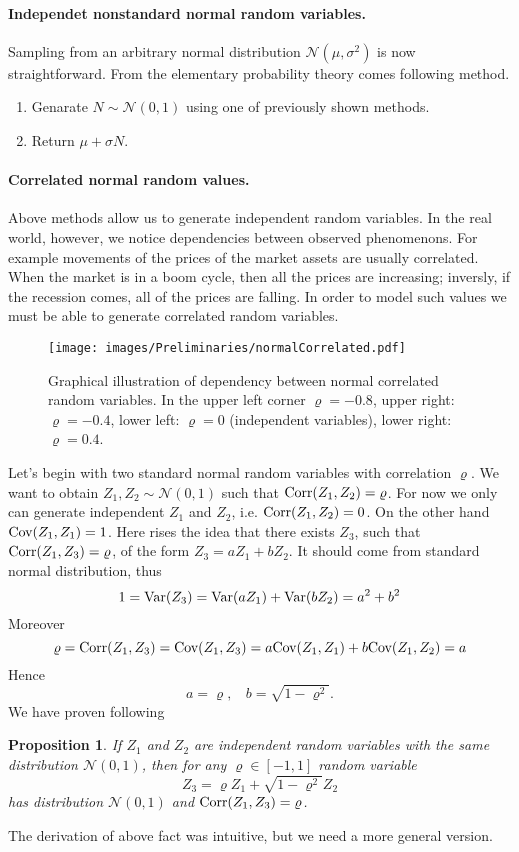\documentclass[a4paper,12pt, oneside]{book}
\newtheorem{prop}[thm]{Proposition}
\theoremstyle{definition}
\theoremstyle{remark}
\def\Var{{\rm Var}}
\def\Cov{{\hbox{Cov}}}
\def\Corr{{\hbox{Corr}}}
\begin{document}
\paragraph{Independet nonstandard normal random variables.} Sampling from an arbitrary normal distribution $\mathcal{N}(\mu, \sigma^2)$ is now straightforward. From the elementary probability theory comes following method.
\begin{enumerate}
 \item Genarate $N \sim \mathcal{N}(0,1)$ using one of previously shown methods.
 \item Return $\mu + \sigma N$.
\end{enumerate}

\paragraph{Correlated normal random values.} Above methods allow us to generate independent random variables. In the real world, however, we notice dependencies between observed phenomenons. For example movements of the prices of the market assets are usually correlated. When the market is in a boom cycle, then all the prices are increasing; inversly, if the recession comes, all of the prices are falling.
In order to model such values we must be able to generate correlated random variables.

\begin{figure}[!ht]
\centering
 \texttt{[image: images/Preliminaries/normalCorrelated.pdf]}
\caption{Graphical illustration of dependency between normal correlated random variables. In the upper left corner $\varrho = -0.8$, upper right: $\varrho = -0.4$, lower left: $\varrho = 0$ (independent variables), lower right: $\varrho = 0.4$.}
\end{figure}

Let's begin with two standard normal random variables with correlation $\varrho$. We want to obtain $Z_1, Z_2 \sim \mathcal{N}(0,1)$ such that $\Corr(Z_1, Z_2) = \varrho$.  For now we only can generate independent $Z_1$ and $Z_2$, i.e. $\Corr(Z_1, Z_2) = 0$. On the other hand $\Cov(Z_1, Z_1) = 1$. Here rises the idea that there exists $Z_3$, such that $\Corr(Z_1, Z_3) = \varrho$, of the form $Z_3 = a Z_1 + b Z_2$.
It should come from standard normal distribution, thus
\[ 1 = \Var(Z_3) = \Var( a Z_1) +  \Var(b Z_2) = a^2 + b^2 \]
Moreover
\[ \varrho = \Corr(Z_1, Z_3) = \Cov(Z_1, Z_3) = a\Cov(Z_1, Z_1) + b\Cov(Z_1, Z_2) = a \]
Hence
\[ a = \varrho,\ \ \ \ b = \sqrt{1 - \varrho^2}. \]
We have proven following
\begin{prop}
 If $Z_1$ and $Z_2$ are independent random variables with the same distribution $\mathcal{N}(0,1)$, then for any $\varrho \in [-1,1]$ random variable
 \[ Z_3 = \varrho Z_1 + \sqrt{1 - \varrho^2} Z_2 \]
 has distribution $\mathcal{N}(0,1)$ and $\Corr(Z_1, Z_3) = \varrho$.
\end{prop}
The derivation of above fact was intuitive, but we need a more general version.
\end{document}
